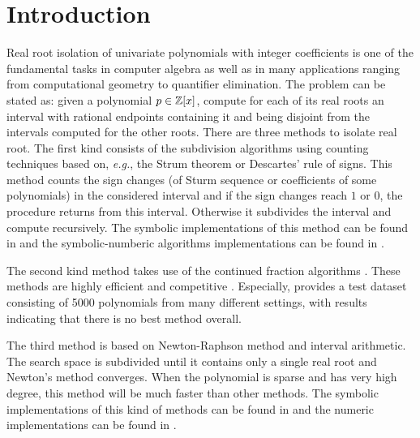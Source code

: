 
\section{Introduction }
\label{}
Real root isolation of univariate polynomials with integer coefficients is one of the fundamental tasks in computer algebra as well as in many applications ranging from computational geometry to quantifier elimination. The problem can be stated as: given a polynomial $p\in {\mathbb Z}[x]$, compute for each of its real roots an interval with rational endpoints containing it and being disjoint from the intervals
computed for the other roots.  There are three methods to isolate real root.  The first kind consists of the subdivision algorithms using counting techniques based  on, {\it e.g.}, the Strum theorem or
Descartes' rule of signs.  This  method counts the sign changes (of Sturm sequence or coefficients of some polynomials) in the considered interval and if the sign changes reach $1$ or $0$, the procedure returns from this interval.
Otherwise it subdivides the interval and compute recursively. The symbolic implementations of this method can be found in \cite{collin76,rou04,kobel2016computing,Tsigaridas2016} and the symbolic-numberic algorithms implementations can be found in \cite{rou04,eig05,eig08,meh11}.

The second kind method takes use of the continued fraction algorithms \cite{akr08,tsi08,sha08}. These methods are highly efficient and competitive \cite{rou04,hemmer09}. Especially,  \cite{hemmer09} provides a test dataset   consisting of 5000 polynomials from many
different settings,  with results indicating that there is no best method overall.

The third method is based on Newton-Raphson method and interval arithmetic.
The search space is subdivided until it contains only a single real root and Newton's method converges. When the polynomial is sparse and has very high degree, this method will be much faster than other methods. The symbolic implementations of this kind of methods can be found in \cite{xia06,xia07} and the numeric implementations
can be found in \cite{kla93,rump99}.

